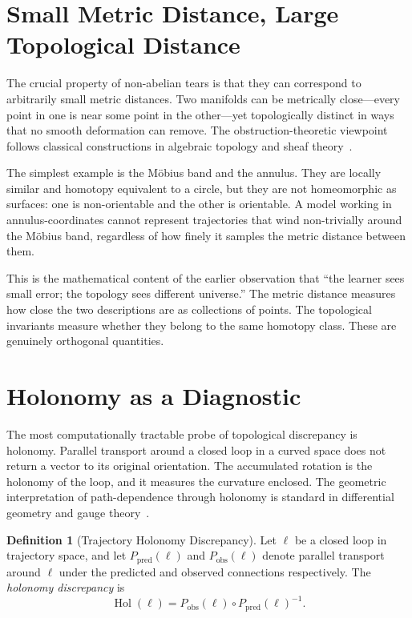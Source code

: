 \documentclass[12pt,oneside]{book}
\theoremstyle{plain}
\theoremstyle{definition}
\newtheorem{definition}[theorem]{Definition}
\theoremstyle{remark}
\DeclareMathOperator{\Hol}{Hol}
\newcommand{\1}{\mathbf{1}}
\begin{document}
\section{Small Metric Distance, Large Topological Distance}

The crucial property of non-abelian tears is that they can correspond to arbitrarily small metric distances. Two manifolds can be metrically close---every point in one is near some point in the other---yet topologically distinct in ways that no smooth deformation can remove. The obstruction-theoretic viewpoint follows classical constructions in algebraic topology and sheaf theory~\cite{spanier1966,kashiwara2006}.

The simplest example is the M\"{o}bius band and the annulus. They are locally similar and homotopy equivalent to a circle, but they are not homeomorphic as surfaces: one is non-orientable and the other is orientable. A model working in annulus-coordinates cannot represent trajectories that wind non-trivially around the M\"{o}bius band, regardless of how finely it samples the metric distance between them.

This is the mathematical content of the earlier observation that ``the learner sees small error; the topology sees different universe.'' The metric distance measures how close the two descriptions are as collections of points. The topological invariants measure whether they belong to the same homotopy class. These are genuinely orthogonal quantities.

\section{Holonomy as a Diagnostic}

The most computationally tractable probe of topological discrepancy is holonomy. Parallel transport around a closed loop in a curved space does not return a vector to its original orientation. The accumulated rotation is the holonomy of the loop, and it measures the curvature enclosed. The geometric interpretation of path-dependence through holonomy is standard in differential geometry and gauge theory~\cite{nakahara2003,gallier2020}.

\begin{definition}[Trajectory Holonomy Discrepancy]
Let $\ell$ be a closed loop in trajectory space, and let $P_{\mathrm{pred}}(\ell)$ and $P_{\mathrm{obs}}(\ell)$ denote parallel transport around $\ell$ under the predicted and observed connections respectively. The \emph{holonomy discrepancy} is
\[
\Hol(\ell) = P_{\mathrm{obs}}(\ell) \circ P_{\mathrm{pred}}(\ell)^{-1}.
\]
\end{definition}
\end{document}
